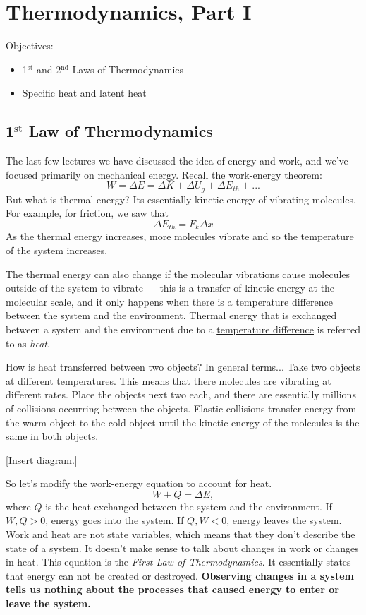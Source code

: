 \section{Thermodynamics, Part I}
Objectives:
\begin{itemize}
\item 1$^\mathrm{st}$ and 2$^\mathrm{nd}$ Laws of Thermodynamics
\item Specific heat and latent heat
\end{itemize}

\hrulefill

\subsection{1$^\mathrm{st}$ Law of Thermodynamics}
The last few lectures we have discussed the idea of energy and work, and we've focused primarily on mechanical energy. Recall the work-energy theorem:
$$W=\Delta{E}=\Delta{K}+\Delta{U_g}+\Delta{E_{th}}+...$$
But what is thermal energy? Its essentially kinetic energy of vibrating molecules. For example, for friction, we saw that
$$\Delta{E_{th}}=F_k\Delta{x}$$
As the thermal energy increases, more molecules vibrate and so the temperature of the system increases.

The thermal energy can also change if the molecular vibrations cause molecules outside of the system to vibrate --- this is a transfer of kinetic energy at the molecular scale, and it only happens when there is a temperature difference between the system and the environment. Thermal energy that is exchanged between a system and the environment due to a \underline{temperature difference} is referred to as \textit{heat}.

How is heat transferred between two objects? In general terms... Take two objects at different temperatures. This means that there molecules are vibrating at different rates. Place the objects next two each, and there are essentially millions of collisions occurring between the objects. Elastic collisions transfer energy from the warm object to the cold object until the kinetic energy of the molecules is the same in both objects.

[Insert diagram.]
\vspace{5cm}

So let's modify the work-energy equation to account for heat.
$$W+Q=\Delta{E},$$
where $Q$ is the heat exchanged between the system and the environment. If $W,Q>0$, energy goes into the system. If $Q,W<0$, energy leaves the system. Work and heat are not state variables, which means that they don't describe the state of a system. It doesn't make sense to talk about changes in work or changes in heat.  This equation is the \textit{First Law of Thermodynamics}. It essentially states that energy can not be created or destroyed. \textbf{Observing changes in a system tells us nothing about the processes that caused energy to enter or leave the system.}

